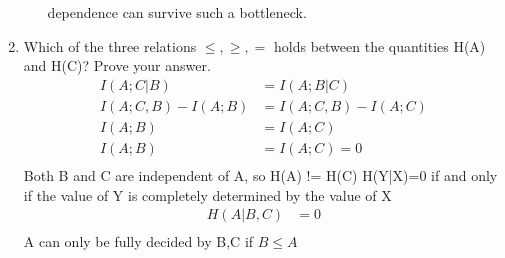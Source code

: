 \documentclass[pdftex,12pt,a4paper]{article}
\begin{document}
\begin{enumerate}
\begin{enumerate}
                dependence can survive such a bottleneck. 
        \end{enumerate}
    \clearpage
    \item Which of the three relations $\le, \ge, =$ holds between the quantities
        H(A) and H(C)? Prove your answer.
        \begin{align}
            I(A;C|B) &= I(A;B|C)\\
            I(A;C,B) - I(A;B) &= I(A;C,B) - I(A;C)\\
            I(A;B) &= I(A;C)\\
            I(A;B) &= I(A;C) = 0\\
        \end{align}
        Both B and C are independent of A, so H(A) != H(C)
        H(Y|X)=0  if and only if the value of Y is completely determined by the
        value of X
        \begin{align}
            H(A|B,C) &= 0\\
        \end{align}
        A can only be fully decided by B,C if $B\le A$
\end{enumerate}
\end{document}
